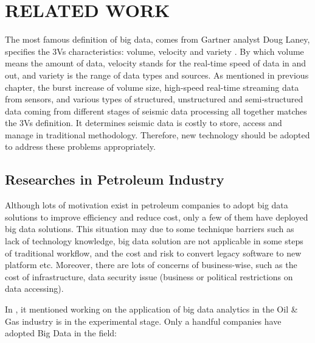 %
%
%

\chapter{\uppercase{Related Work}}

The most famous definition of big data, comes from Gartner analyst Doug Laney, specifies the 3Vs characteristics: volume, velocity and variety \cite{demauro2016}. By which volume means the amount of data, velocity stands for the real-time speed of data in and out, and variety is the range of data types and sources. As mentioned in previous chapter,  the burst increase of volume size, high-speed real-time streaming data from sensors, and various types of structured, unstructured and semi-structured data coming from different stages of seismic data processing all together matches the 3Vs definition. It determines seismic data is costly to store, access and manage in traditional methodology. Therefore, new technology should be adopted to address these problems appropriately.

\section{Researches in Petroleum Industry}

Although lots of motivation exist in petroleum companies to adopt big data solutions to improve efficiency and reduce cost, only a few of them have deployed big data solutions. This situation may due to some technique barriers such as lack of technology knowledge, big data solution are not applicable in some steps of traditional workflow, and the cost and risk to convert legacy software to new platform etc. Moreover, there are lots of concerns of business-wise, such as the cost of infrastructure, data security issue (business or political restrictions on data accessing). 

In \cite{bigdatatooil}, it mentioned working on the application of big data analytics in the Oil \& Gas industry is in the experimental stage. Only a handful companies have adopted Big Data in the field: \\

